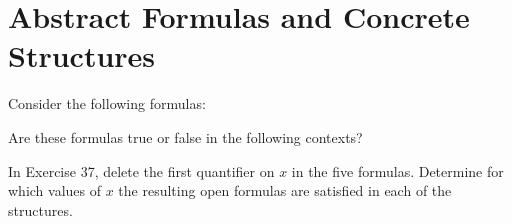 \section{Abstract Formulas and Concrete Structures}

\begin{Exercise} [number=37]
Consider the following formulas:

Are these formulas true or false in the following contexts?
\end{Exercise}

\begin{Exercise} [number=38]
In Exercise 37, delete the first quantifier on $x$ in the five formulas. Determine for which values of $x$ the resulting open formulas are satisfied in each of the structures.
\end{Exercise}